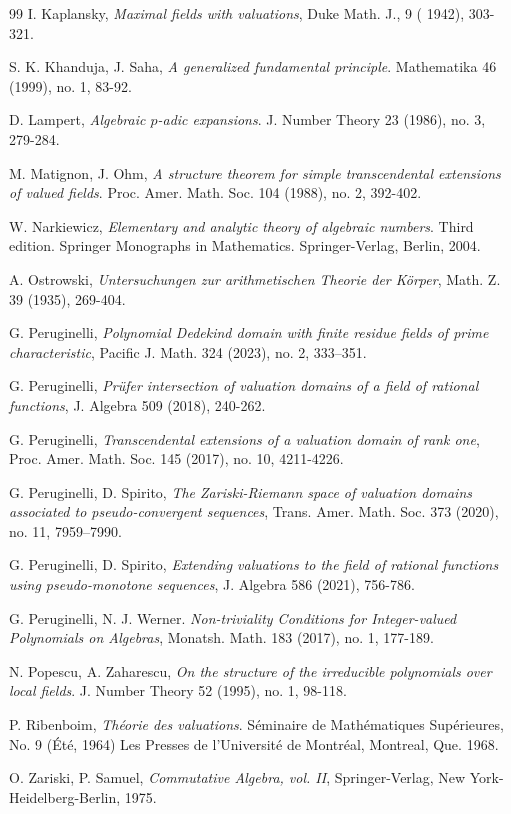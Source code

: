 \documentclass[10pt]{article}
\numberwithin{equation}{section}
\theoremstyle{definition}\newtheorem{Def}[equation]{Definition}
\theoremstyle{definition}\newtheorem{Ques}[equation]{Question}
\begin{document}
\begin{thebibliography}{99}
 I. Kaplansky, \emph{Maximal fields with valuations}, Duke Math. J.,  9 ( 1942), 303-321.

 S. K. Khanduja, J. Saha, \emph{A generalized fundamental principle}. Mathematika 46 (1999), no. 1, 83-92. 

 D. Lampert, \emph{Algebraic $p$-adic expansions}.
J. Number Theory 23 (1986), no. 3, 279-284.

  M. Matignon, J. Ohm, \emph{A structure theorem for simple transcendental extensions of valued fields}. Proc. Amer. Math. Soc. 104 (1988), no. 2, 392-402. 

 W. Narkiewicz, \emph{Elementary and analytic theory of algebraic numbers}. Third edition. Springer Monographs in Mathematics. Springer-Verlag, Berlin, 2004.

 A. Ostrowski, \emph{Untersuchungen zur arithmetischen Theorie der K\"orper},
Math. Z. 39 (1935), 269-404.



 G. Peruginelli, \emph{Polynomial Dedekind domain with finite residue fields of prime characteristic}, Pacific J. Math. 324 (2023), no. 2, 333–351.

 G. Peruginelli, \emph{Pr\"ufer intersection of valuation domains of a field of rational functions}, J. Algebra 509 (2018), 240-262.

 G. Peruginelli, \emph{Transcendental extensions of a valuation domain of rank one}, Proc. Amer. Math. Soc. 145 (2017), no. 10, 4211-4226.

 G. Peruginelli, D. Spirito, \emph{The Zariski-Riemann space of valuation domains associated to pseudo-convergent sequences}, Trans. Amer. Math. Soc. 373 (2020), no. 11, 7959–7990.

 G. Peruginelli, D. Spirito, \emph{Extending valuations to the field of rational functions using pseudo-monotone sequences}, J. Algebra 586 (2021), 756-786.

 G. Peruginelli, N. J. Werner. \emph{Non-triviality Conditions for Integer-valued Polynomials on Algebras},  Monatsh. Math. 183 (2017), no. 1, 177-189. 

 N. Popescu, A. Zaharescu, \emph{On the structure of the irreducible polynomials over local fields}. J. Number Theory 52 (1995), no. 1, 98-118. 

 P. Ribenboim, \emph{Th\'eorie des valuations}. S\'eminaire de Math\'ematiques Sup\'erieures, No. 9 (\'Et\'e, 1964) Les Presses de l'Universit\'e de Montr\'eal, Montreal, Que. 1968.

 O. Zariski, P. Samuel, \emph{Commutative Algebra, vol. II}, Springer-Verlag, New York-Heidelberg-Berlin, 1975.

\end{thebibliography}
\end{document}
